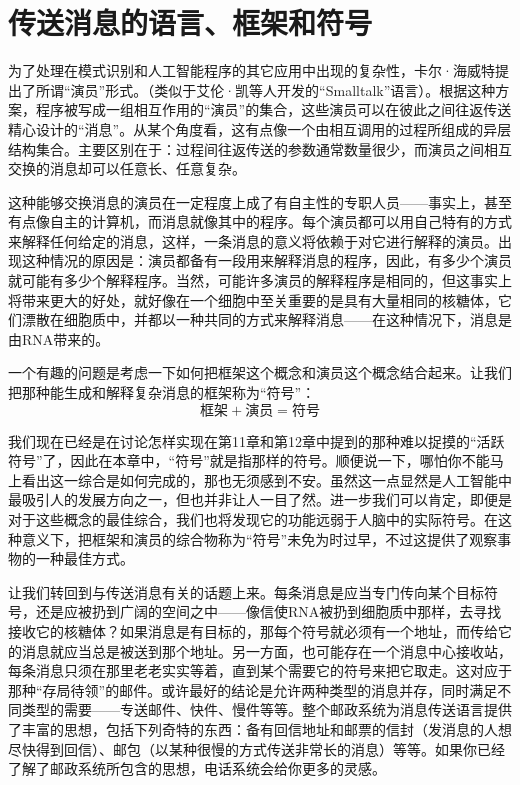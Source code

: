 \section{传送消息的语言、框架和符号}

为了处理在模式识别和人工智能程序的其它应用中出现的复杂性，卡尔·海威特提出了所谓“演员”形式。（类似于艾伦·凯等人开发的“Smalltalk”语言）。根据这种方案，程序被写成一组相互作用的“演员”的集合，这些演员可以在彼此之间往返传送精心设计的“消息”。从某个角度看，这有点像一个由相互调用的过程所组成的异层结构集合。主要区别在于：过程间往返传送的参数通常数量很少，而演员之间相互交换的消息却可以任意长、任意复杂。

这种能够交换消息的演员在一定程度上成了有自主性的专职人员——事实上，甚至有点像自主的计算机，而消息就像其中的程序。每个演员都可以用自己特有的方式来解释任何给定的消息，这样，一条消息的意义将依赖于对它进行解释的演员。出现这种情况的原因是：演员都备有一段用来解释消息的程序，因此，有多少个演员就可能有多少个解释程序。当然，可能许多演员的解释程序是相同的，但这事实上将带来更大的好处，就好像在一个细胞中至关重要的是具有大量相同的核糖体，它们漂散在细胞质中，并都以一种共同的方式来解释消息——在这种情况下，消息是由RNA带来的。

一个有趣的问题是考虑一下如何把框架这个概念和演员这个概念结合起来。让我们把那种能生成和解释复杂消息的框架称为“符号”：
\[
\text{框架}+\text{演员}=\text{符号}
\]

我们现在已经是在讨论怎样实现在第11章和第12章中提到的那种难以捉摸的“活跃符号”了，因此在本章中，“符号”就是指那样的符号。顺便说一下，哪怕你不能马上看出这一综合是如何完成的，那也无须感到不安。虽然这一点显然是人工智能中最吸引人的发展方向之一，但也并非让人一目了然。进一步我们可以肯定，即便是对于这些概念的最佳综合，我们也将发现它的功能远弱于人脑中的实际符号。在这种意义下，把框架和演员的综合物称为“符号”未免为时过早，不过这提供了观察事物的一种最佳方式。

让我们转回到与传送消息有关的话题上来。每条消息是应当专门传向某个目标符号，还是应被扔到广阔的空间之中——像信使RNA被扔到细胞质中那样，去寻找接收它的核糖体？如果消息是有目标的，那每个符号就必须有一个地址，而传给它的消息就应当总是被送到那个地址。另一方面，也可能存在一个消息中心接收站，每条消息只须在那里老老实实等着，直到某个需要它的符号来把它取走。这对应于那种“存局待领”的邮件。或许最好的结论是允许两种类型的消息并存，同时满足不同类型的需要——专送邮件、快件、慢件等等。整个邮政系统为消息传送语言提供了丰富的思想，包括下列奇特的东西：备有回信地址和邮票的信封（发消息的人想尽快得到回信）、邮包（以某种很慢的方式传送非常长的消息）等等。如果你已经了解了邮政系统所包含的思想，电话系统会给你更多的灵感。

